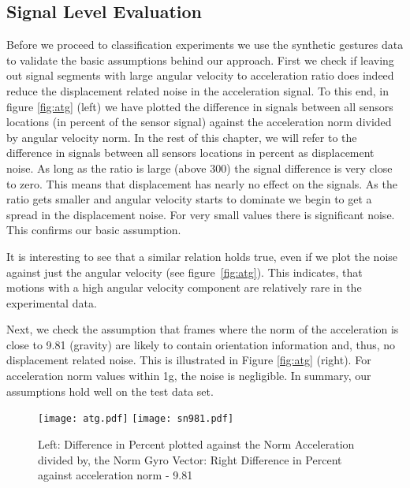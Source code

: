 \subsection{Signal Level Evaluation}
Before we proceed to classification experiments we use
the synthetic gestures data to validate the basic assumptions behind
our approach. 
First we check if  leaving  out signal segments with large angular
velocity to acceleration ratio does indeed reduce the displacement
related noise in the acceleration signal. To this end, in figure 
\ref{fig:atg} (left) we have plotted the difference in signals between all sensors
locations  (in
percent of the sensor signal)  against the acceleration norm divided
by  angular velocity norm. In the rest of this chapter, we will refer to
the difference in signals between all sensors
locations in percent as displacement noise.
As long as the ratio is large (above 300) the signal difference is very close to
zero. This means that displacement has nearly no effect on the
signals. As the ratio gets smaller and angular velocity starts to
dominate we begin to get a spread in the displacement noise. For very small
values there is significant noise. This confirms our basic assumption.

It is interesting to see that a similar relation holds true, even if we plot
the noise against just the angular velocity (see figure~\ref{fig:atg}).
This indicates, that motions with a high angular velocity
component are relatively rare in the experimental data.
  
Next, we check the assumption that frames where the norm of the
acceleration is close to 9.81 (gravity) are likely to contain 
orientation information and, thus, no displacement related
noise. This is illustrated in Figure
\ref{fig:atg} (right). For acceleration norm values
within 1g, the noise is negligible.
In summary, our assumptions hold well on the test data set. 


\begin{figure*}[t]
\centering   
\texttt{[image: atg.pdf]}
\texttt{[image: sn981.pdf]}

\caption[Ratio plot confirming our approach]{Left: Difference in Percent plotted against the Norm
  Acceleration divided by,
the Norm Gyro Vector: 
Right Difference in Percent against acceleration norm - 9.81 }
\label{fig:atg}
\label{fig:sn981}
\label{fig:sngyro}
\end{figure*}

